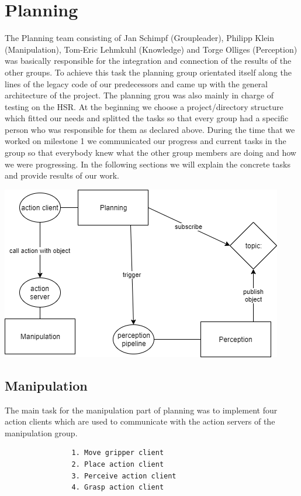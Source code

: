 \documentclass[main.tex]{subfiles}
\begin{document}
	
	\chapter{Planning}
	
	 The Planning team consisting of Jan Schimpf (Groupleader), Philipp Klein (Manipulation), Tom-Eric Lehmkuhl (Knowledge) and Torge Olliges (Perception) was basically responsible for the integration and connection of the results of the other groups. To achieve this task the planning group orientated itself along the lines of the legacy code of our predecessors and came up with the general architecture of the project. The planning grou was also mainly in charge of testing on the HSR. At the beginning we choose a project/directory structure which fitted our needs and splitted the tasks so that every group had a specific person who was responsible for them as declared above. During the time that we worked on milestone 1 we communicated our progress and current tasks in the group so that everybody knew what the other group members are doing and how we were progressing. In the following sections we will explain the concrete tasks and provide results of our work.

\includegraphics[scale=0.5]{subdocuments/architecture.png}

\section{Manipulation}

                The main task for the manipulation part of planning was to implement four action clients which are used to communicate with the action servers of the manipulation group.
		\begin{lstlisting}
                1. Move gripper client
                2. Place action client
                3. Perceive action client
                4. Grasp action client
		\end{lstlisting}
\end{document}
